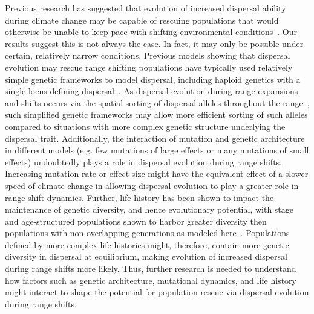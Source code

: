 \documentclass[11pt]{article}
\begin{document}
Previous research has suggested that evolution of increased dispersal ability during climate change may be capable of rescuing populations that would otherwise be unable to keep pace with shifting environmental conditions~\citep{boeye2013more, henry2013eco}. Our results suggest this is not always the case. In fact, it may only be possible under certain, relatively narrow conditions. Previous models showing that dispersal evolution may rescue range shifting populations have typically used relatively simple genetic frameworks to model dispersal, including haploid genetics with a single-locus defining dispersal~\citep{boeye2013more, hargreaves2015fitness}. As dispersal evolution during range expansions and shifts occurs via the spatial sorting of dispersal alleles throughout the range~\citep{shine2011evolutionary}, such simplified genetic frameworks may allow more efficient sorting of such alleles compared to situations with more complex genetic structure underlying the dispersal trait. Additionally, the interaction of mutation and genetic architecture in different models (e.g. few mutations of large effects or many mutations of small effects) undoubtedly plays a role in dispersal evolution during range shifts. Increasing mutation rate or effect size might have the equivalent effect of a slower speed of climate change in allowing dispersal evolution to play a greater role in range shift dynamics. Further, life history has been shown to impact the maintenance of genetic diversity, and hence evolutionary potential, with stage and age-structured populations shown to harbor greater diversity then populations with non-overlapping generations as modeled here~\citep{ellner1996environmental}. Populations defined by more complex life histories might, therefore, contain more genetic diversity in dispersal at equilibrium, making evolution of increased dispersal during range shifts more likely. Thus, further research is needed to understand how factors such as genetic architecture, mutational dynamics, and life history might interact to shape the potential for population rescue via dispersal evolution during range shifts.
\end{document}
